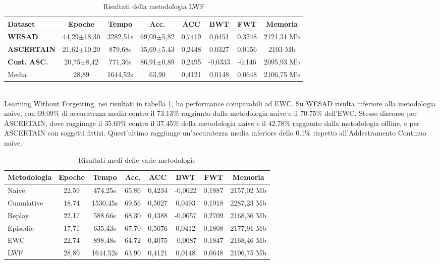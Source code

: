 \begin{table}[h]
\footnotesize
    \begin{tabular}{l|c|c|c|c|c|c|c}
        \textbf{Dataset} & \textbf{Epoche} & \textbf{Tempo} & \textbf{Acc.} & \textbf{ACC} & \textbf{BWT} & \textbf{FWT} & \textbf{Memoria}\\
        \hline
        \textbf{WESAD} & 44,29$\pm$18,30 & 3282,51s & 69,09$\pm$5,82 & 0,7419 & 0,0451 & 0,3248 & 2121,31 Mb\\
        \textbf{ASCERTAIN} & 21,62$\pm$10,20 & 879,68s & 35,69$\pm$5,43 & 0,2448 & 0.0327 & 0,0156 & 2103 Mb\\
        \textbf{Cust. ASC.} & 20,75$\pm$8,42 & 771,36s & 86,91$\pm$0,89 & 0,2495 & -0,0333 & -0,146 & 2095,93 Mb\\
        \hline
        Media & 28,89 & 1644,52s & 63,90 & 0,4121 & 0,0148 & 0,0648 & 2106,75 Mb
    \end{tabular}
    \caption{Risultati della metodologia LWF}
    \label{tab:reslwf}
\end{table}\\
Learning Without Forgetting, nei risultati in tabella \ref{tab:reslwf}, ha performance comparabili ad EWC. Su WESAD risulta inferiore alla metodologia naive, con 69.09\% di accuratezza media contro il 73.13\% raggiunto dalla metodologia naive e il 70.75\% dell'EWC. Stesso discorso per ASCERTAIN, dove raggiunge il 35.69\% contro il 37.45\% della metodologia naive e il 42.78\% raggiunto dalla metodologia offline, e per ASCERTAIN con soggetti fittizi. Quest'ultimo raggiunge un'accuratezza media inferiore dello 0.1\% rispetto all'Addestramento Continuo naive.
\begin{table}[h]
\footnotesize
    \begin{center}
        \begin{tabular}{l|c|c|c|c|c|c|c}
            \textbf{Metodologia} & \textbf{Epoche} & \textbf{Tempo} & \textbf{Acc.} & \textbf{ACC} & \textbf{BWT} & \textbf{FWT} & \textbf{Memoria}\\
            \hline
            Naive & 22,59 & 474,25s & 65,86 & 0,4234 & -0,0022 & 0,1887 & 2157,02 Mb\\
            Cumulative & 18,74 & 1530,45s & 69,56 & 0,5027 & 0,0493 & 0,1918 & 2287,23 Mb\\
            Replay & 22,17 & 588,66s & 68,30 & 0,4388 & -0,0057 & 0,2709 & 2168,36 Mb\\
            Episodic & 17,71 & 635,43s & 67,70 & 0,5076 & 0,0412 & 0,1808 & 2177,91 Mb\\
            EWC & 22,74 & 898,48s & 64,72 & 0,4075 & -0,0087 & 0,1847 & 2168,46 Mb\\
            LWF & 28,89 & 1644,52s & 63,90 & 0,4121 & 0,0148 & 0,0648 & 2106,75 Mb
        \end{tabular}
        \caption{Risultati medi delle varie metodologie}
        \label{tab:allres_mean}
    \end{center}
\end{table}